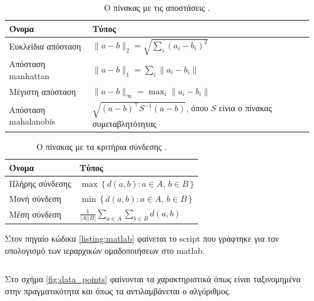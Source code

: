 \documentclass{assignment}
\begin{document}
\begin{table}[htbp]
\begin{center}
  \begin{tabular}{|m{}|m{}|}
    \hline
    {\bf Όνομα} & {\bf Τύπος}  \\ \hline
    Ευκλείδια απόσταση   & $\|a-b \|_2 = \sqrt{\sum_i (a_i-b_i)^2}$  \\ \hline
    Απόσταση manhattan   & $\|a-b \|_1 = \sum_i \|a_i-b_i \|$ \\ \hline
    Μέγιστη απόσταση     & $\|a-b \|_\infty = \max_i \|a_i-b_i\|$ \\ \hline
    Απόσταση mahalanobis & $ \sqrt{(a-b)^{\top}S^{-1}(a-b)} $, όπου $S$ είνια ο πίνακας συμεταβλητότητας   \\ \hline
  \end{tabular}
\caption{Ο πίνακας με τις αποστάσεις \cite{wiki:hierarchical_clustering}.}
\label{table:metric_distances}
\end{center}
\end{table}


\begin{table}[htbp]
\begin{center}
  \begin{tabular}{|m{}|m{}|}
    \hline
    {\bf Όνομα} & {\bf Τύπος}  \\ \hline
    Πλήρης σύνδεσης   & $\max \, \{\, d(a,b) : a \in A,\, b \in B \,\}$  \\ \hline
    Μονή σύνδεση   & $ \min \, \{\, d(a,b) : a \in A,\, b \in B \,\}$ \\ \hline
    Μέση σύνδεση   & $\frac{1}{|A| |B|} \sum_{a \in A }\sum_{ b \in B} d(a,b)$ \\ \hline
  \end{tabular}
\caption{Ο πίνακας με τα κριτήρια σύνδεσης \cite{wiki:hierarchical_clustering}.}
\label{table:metric_linkage}
\end{center}
\end{table}


Στον πηγαίο κώδικα \ref{listing:matlab} φαίνεται το script που γράφτηκε για τον υπολογισμό των ιεραρχικών ομαδοποιήσεων στο matlab.

\inputminted[breaklines=true, frame=lines, framesep=2mm, baselinestretch=1.2, fontsize=\footnotesize, linenos]{matlab}{../matlab/features.m} 
\label{listing:matlab}

Στο σχήμα \ref{fig:data_points} φαίνονται τα χαρακτηριστικά όπως είναι ταξινομημένα στην πραγματικότητα και όπως τα αντιλαμβάνεται ο αλγόριθμος.
\end{document}
